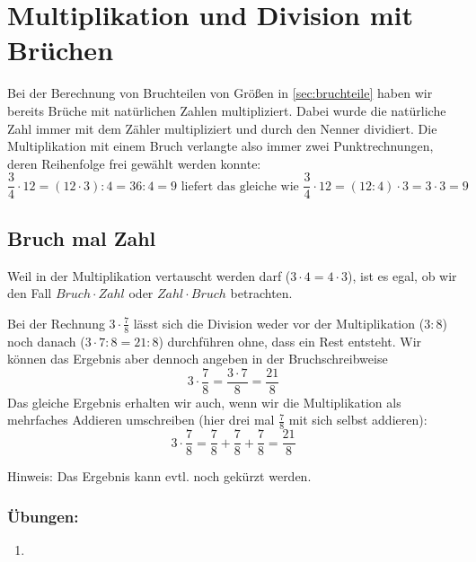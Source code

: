 \section{Multiplikation und Division mit Brüchen}\vspace{-1em}
Bei der Berechnung von Bruchteilen von Größen in \autoref{sec:bruchteile} haben wir bereits Brüche mit natürlichen Zahlen multipliziert. Dabei wurde die natürliche Zahl immer mit dem Zähler multipliziert und durch den Nenner dividiert. Die Multiplikation mit einem Bruch verlangte also immer zwei Punktrechnungen, deren Reihenfolge frei gewählt werden konnte:
\begin{equation*}
	\frac{3}{4}\cdot 12 = (12\cdot3) : 4 = 36:4 = 9\text{ liefert das gleiche wie }\frac{3}{4}\cdot 12 = (12:4)\cdot 3 = 3\cdot 3=9
\end{equation*}

\subsection{Bruch mal Zahl}\vspace{-1em}
Weil in der Multiplikation vertauscht werden darf ($3\cdot4=4\cdot3$), ist es egal, ob wir den Fall $Bruch\cdot Zahl$ oder $Zahl\cdot Bruch$ betrachten. 

Bei der Rechnung $3\cdot \frac{7}{8}$ lässt sich die Division weder vor der Multiplikation ($3:8$) noch danach ($3\cdot7:8=21:8$) durchführen ohne, dass ein Rest entsteht. Wir können das Ergebnis aber dennoch angeben in der Bruchschreibweise
\begin{equation*}
	3\cdot \frac{7}{8} = \frac{3\cdot 7}{8}=\frac{21}{8}
\end{equation*}
Das gleiche Ergebnis erhalten wir auch, wenn wir die Multiplikation als mehrfaches Addieren umschreiben (hier drei mal $\frac{7}{8}$ mit sich selbst addieren):
\begin{equation*}
	3\cdot \frac{7}{8} = \frac{7}{8}+\frac{7}{8}+\frac{7}{8}=\frac{21}{8}
\end{equation*}

Hinweis: Das Ergebnis kann evtl. noch gekürzt werden.

\subsubsection*{Übungen:}\vspace{-1em}
\begin{enumerate}[label=\alph*)]
	\item {}
\end{enumerate}

